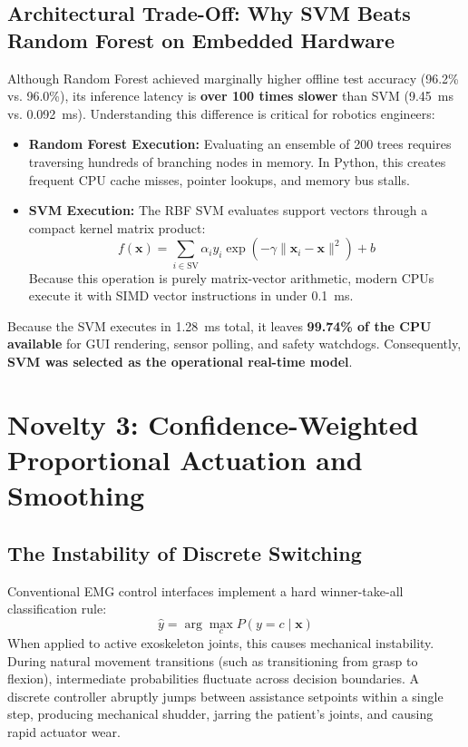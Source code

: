 \documentclass[11pt,a4paper]{article}
\begin{document}
\subsection{Architectural Trade-Off: Why SVM Beats Random Forest on Embedded Hardware}
Although Random Forest achieved marginally higher offline test accuracy (96.2\% vs. 96.0\%), its inference latency is \textbf{over 100 times slower} than SVM (9.45~ms vs. 0.092~ms). Understanding this difference is critical for robotics engineers:
\begin{itemize}
    \item \textbf{Random Forest Execution:} Evaluating an ensemble of 200 trees requires traversing hundreds of branching nodes in memory. In Python, this creates frequent CPU cache misses, pointer lookups, and memory bus stalls.
    \item \textbf{SVM Execution:} The RBF SVM evaluates support vectors through a compact kernel matrix product:
    \begin{equation}
        f(\mathbf{x}) = \sum_{i \in \text{SV}} \alpha_i y_i \exp(-\gamma \|\mathbf{x}_i - \mathbf{x}\|^2) + b
    \end{equation}
    Because this operation is purely matrix-vector arithmetic, modern CPUs execute it with SIMD vector instructions in under 0.1~ms.
\end{itemize}
Because the SVM executes in 1.28~ms total, it leaves \textbf{99.74\% of the CPU available} for GUI rendering, sensor polling, and safety watchdogs. Consequently, \textbf{SVM was selected as the operational real-time model}.

\section{Novelty 3: Confidence-Weighted Proportional Actuation and Smoothing}

\subsection{The Instability of Discrete Switching}
Conventional EMG control interfaces implement a hard winner-take-all classification rule:
\begin{equation}
    \hat{y} = \arg\max_{c} P(y = c \mid \mathbf{x})
\end{equation}
When applied to active exoskeleton joints, this causes mechanical instability. During natural movement transitions (such as transitioning from grasp to flexion), intermediate probabilities fluctuate across decision boundaries. A discrete controller abruptly jumps between assistance setpoints within a single step, producing mechanical shudder, jarring the patient's joints, and causing rapid actuator wear.
\end{document}
